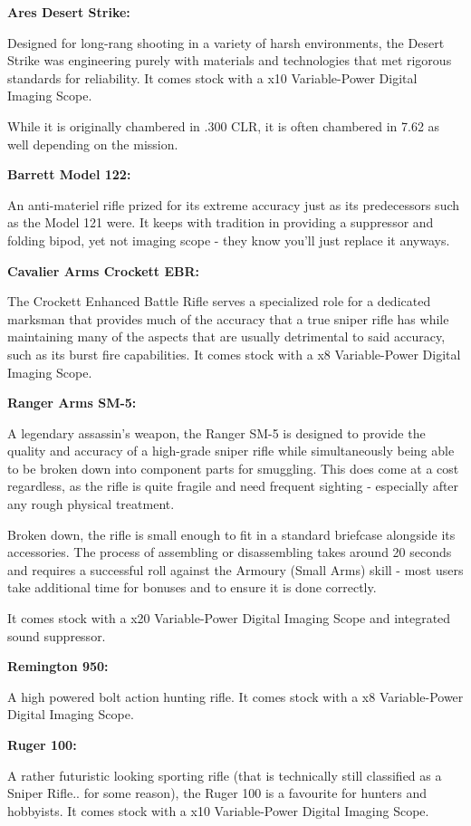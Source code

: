 \begin{multicols}{2}
\begin{breakbox}
	\textbf{Ares Desert Strike:}
	
	Designed for long-rang shooting in a variety of harsh environments, the Desert Strike was engineering purely with materials and technologies that met rigorous standards for reliability. It comes stock with a x10 Variable-Power Digital Imaging Scope.
	
	While it is originally chambered in .300 CLR, it is often chambered in 7.62 as well depending on the mission.
	
	\textbf{Barrett Model 122:}
	
	An anti-materiel rifle prized for its extreme accuracy just as its predecessors such as the Model 121 were. It keeps with tradition in providing a suppressor and folding bipod, yet not imaging scope - they know you'll just replace it anyways.
	
	\textbf{Cavalier Arms Crockett EBR:}
	
	The Crockett Enhanced Battle Rifle serves a specialized role for a dedicated marksman that provides much of the accuracy that a true sniper rifle has while maintaining many of the aspects that are usually detrimental to said accuracy, such as its burst fire capabilities. It comes stock with a x8 Variable-Power Digital Imaging Scope.
	
	\textbf{Ranger Arms SM-5:}
	
	A legendary assassin's weapon, the Ranger SM-5 is designed to provide the quality and accuracy of a high-grade sniper rifle while simultaneously being able to be broken down into component parts for smuggling. This does come at a cost regardless, as the rifle is quite fragile and need frequent sighting - especially after any rough physical treatment.
	
	Broken down, the rifle is small enough to fit in a standard briefcase alongside its accessories. The process of assembling or disassembling takes around 20 seconds and requires a successful roll against the Armoury (Small Arms) skill - most users take additional time for bonuses and to ensure it is done correctly.
	
	It comes stock with a x20 Variable-Power Digital Imaging Scope and integrated sound suppressor.
	
	\textbf{Remington 950:}
	
	A high powered bolt action hunting rifle. It comes stock with a x8 Variable-Power Digital Imaging Scope.
	
	\textbf{Ruger 100:}
	
	A rather futuristic looking sporting rifle (that is technically still classified as a Sniper Rifle.. for some reason), the Ruger 100 is a favourite for hunters and hobbyists. It comes stock with a x10 Variable-Power Digital Imaging Scope.
	

\end{breakbox}
\end{multicols}
